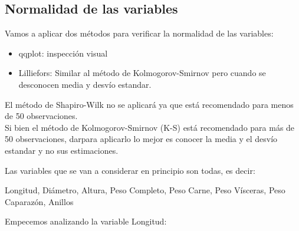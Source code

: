 \documentclass[11pt]{article}
\providecommand{\tightlist}{%
      \setlength{\itemsep}{0pt}\setlength{\parskip}{0pt}}
\begin{document}
\subsection{Normalidad de las
variables}\label{normalidad-de-las-variables}

Vamos a aplicar dos métodos para verificar la normalidad de las
variables:

\begin{itemize}
\tightlist
\item
  qqplot: inspección visual
\item
  Lilliefors: Similar al método de Kolmogorov-Smirnov pero cuando se
  desconocen media y desvío estandar.
\end{itemize}

El método de Shapiro-Wilk no se aplicará ya que está recomendado para
menos de 50 observaciones.\\
Si bien el método de Kolmogorov-Smirnov (K-S) está recomendado para más
de 50 observaciones, darpara aplicarlo lo mejor es conocer la media y el
desvío estandar y no sus estimaciones.

Las variables que se van a considerar en principio son todas, es decir:

Longitud, Diámetro, Altura, Peso Completo, Peso Carne, Peso Vísceras,
Peso Caparazón, Anillos

Empecemos analizando la variable Longitud:
\end{document}

